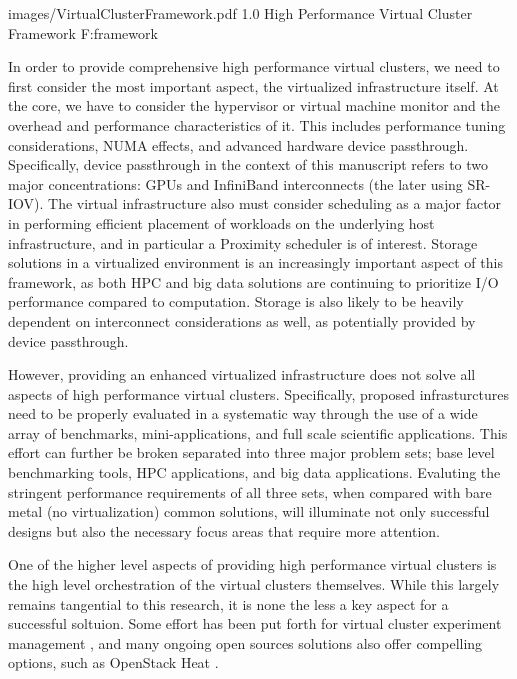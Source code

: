   {images/VirtualClusterFramework.pdf}
  {1.0}
  {High Performance Virtual Cluster Framework}
  {F:framework}

In order to provide comprehensive high performance virtual clusters, we need to first consider the most important aspect, the virtualized infrastructure itself. At the core, we have to consider the hypervisor or virtual machine monitor and the overhead and performance characteristics of it. This includes performance tuning considerations, NUMA effects, and advanced hardware device passthrough. Specifically, device passthrough in the context of this manuscript refers to two major concentrations: GPUs and InfiniBand interconnects (the later using SR-IOV). The virtual infrastructure also must consider scheduling as a major factor in performing efficient placement of workloads on the underlying host infrastructure, and in particular a Proximity scheduler is of interest. Storage solutions in a virtualized environment is an increasingly important aspect of this framework, as both HPC and big data solutions are continuing to prioritize I/O performance compared to computation. Storage is also likely to be heavily dependent on interconnect considerations as well, as potentially provided by device passthrough.  

However, providing an enhanced virtualized infrastructure does not solve all aspects of high performance virtual clusters. Specifically, proposed infrasturctures need to be properly evaluated in a systematic way through the use of a wide array of benchmarks, mini-applications, and full scale scientific applications. This effort can further be broken separated into three major problem sets; base level benchmarking tools, HPC applications, and big data applications. Evaluting the stringent performance requirements of all three sets, when compared with bare metal (no virtualization) common solutions, will illuminate not only successful designs but also the necessary focus areas that require more attention.

One of the higher level aspects of providing high performance virtual clusters is the high level orchestration of the virtual clusters themselves. While this largely remains tangential to this research, it is none the less a key aspect for a successful soltuion. Some effort has been put forth for virtual cluster experiment management \cite{futureGrid-experiment-management}, and many ongoing open sources solutions also offer compelling options, such as OpenStack Heat \cite{www-openstack-heat}.  


